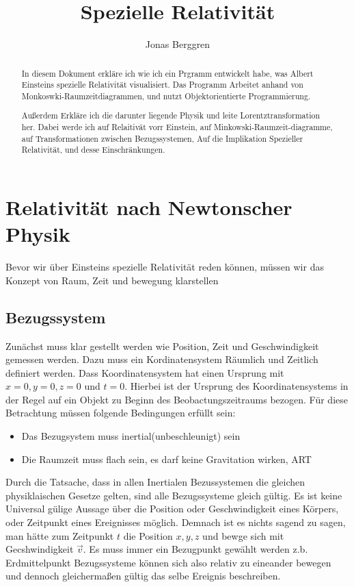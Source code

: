 \documentclass[12pt]{article}
\author{{\Huge Jonas Berggren}}
\title{{\myfont Spezielle Relativität}}
\begin{document}
\maketitle
\tableofcontents
\newpage
\begin{abstract}
In diesem Dokument erkläre ich wie ich ein Prgramm entwickelt habe, was Albert Einsteins spezielle Relativität visualisiert.
Das Programm Arbeitet anhand von Monkoswki-Raumzeitdiagrammen, und nutzt Objektorientierte Programmierung.

Außerdem Erkläre ich die darunter liegende Physik und leite Lorentztransformation her.
Dabei werde ich auf Relaitivät vorr Einstein, auf Minkowski-Raumzeit-diagramme, auf Transformationen zwischen Bezugssystemen, Auf die Implikation Spezieller Relativität, und desse Einschränkungen.
\end{abstract}
\section{Relativität nach Newtonscher Physik}
Bevor wir über Einsteins spezielle Relativität reden können, müssen wir das Konzept von Raum, Zeit und bewegung klarstellen
\subsection{Bezugssystem}
Zunächst muss klar gestellt werden wie Position, Zeit und Geschwindigkeit gemessen werden.
Dazu muss ein Kordinatensystem Räumlich und Zeitlich definiert werden.
Dass Koordinatensystem hat einen Ursprung  mit $x = 0, y =0, z = 0$ und $t = 0$.
Hierbei ist der Ursprung des Koordinatensystems in der Regel auf ein Objekt zu Beginn des Beobactungszeitraums bezogen.
Für diese Betrachtung müssen folgende Bedingungen erfüllt sein:
\begin{itemize}
\item Das Bezugsystem muss inertial(unbeschleunigt) sein
\item Die Raumzeit muss flach sein, es darf keine Gravitation wirken, ART
\end{itemize}
Durch die Tatsache, dass in allen Inertialen Bezussystemen die gleichen physiklaischen Gesetze gelten, sind alle Bezugssysteme gleich gültig.
Es ist keine Universal gülige Aussage über die Position oder Geschwindigkeit eines Körpers, oder Zeitpunkt eines Ereignisses möglich.
Demnach ist es nichts sagend zu sagen, man hätte zum Zeitpunkt $t$ die Position $x, y, z$ und bewge sich mit Gecshwindigkeit $\vec{v}$.
Es muss immer ein Bezugpunkt gewählt werden z.b. Erdmittelpunkt %
Bezugssysteme können sich also relativ zu eineander bewegen und dennoch gleichermaßen gültig das selbe Ereignis beschreiben.
\end{document}
